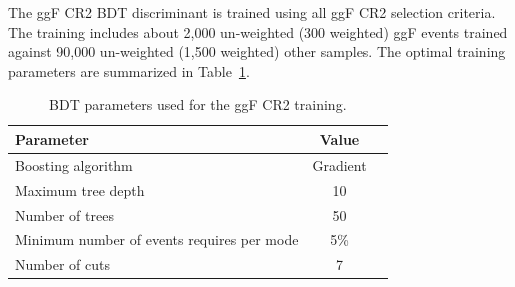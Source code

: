 The ggF CR2 BDT discriminant is trained using all ggF CR2 selection criteria. The training includes about 2,000 un-weighted (300 weighted) ggF events trained against 90,000 un-weighted (1,500 weighted) other samples. The optimal training parameters are summarized in Table~\ref{tab:ggFCR2BDTparameters}.
\begin{table}[h!]
\centering
\begin{tabular}{|l|c|c|}
\hline
Parameter                                    & Value     \\
\hline
Boosting algorithm                           & Gradient \\
Maximum tree depth                           &  10      \\
Number of trees                              &  50    \\
Minimum number of events requires per mode   &  5\%     \\ 
Number of cuts                               &  7       \\
\hline
\end{tabular}
\caption{BDT parameters used for the ggF CR2 training.}
\label{tab:ggFCR2BDTparameters}
\end{table}

